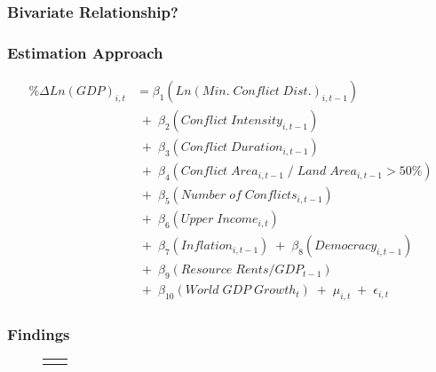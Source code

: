 \begin{frame}
\frametitle{Bivariate Relationship?}

\vspace{-0.25cm}
\begin{figure}[ht]
  \centering
  \resizebox{1\textwidth}{!}{}
\end{figure}

\end{frame}

\begin{frame}
\frametitle{Estimation Approach}

\begin{align*}
	\% \Delta Ln(GDP)_{i,t} &= \beta_{1}(Ln(Min. \; Conflict \; Dist.)_{i,t-1}) \\
	& \;+\; \beta_{2}(Conflict \; Intensity_{i,t-1}) \\
	& \;+\; \beta_{3}(Conflict \; Duration_{i,t-1}) \\
	& \;+\; \beta_{4}(Conflict \; Area_{i,t-1} \;/\; Land \; Area_{i,t-1} > 50\%) \\
	& \;+\; \beta_{5}(Number \; of \; Conflicts_{i,t-1}) \\
	& \;+\; \beta_{6}(Upper \; Income_{i,t}) \\	
	& \;+\; \beta_{7}(Inflation_{i,t-1}) \;+\; \beta_{8}(Democracy_{i,t-1}) \\
	& \;+\; \beta_{9}(Resource \; Rents/GDP_{t-1}) \\ 
	& \;+\; \beta_{10}(World \; GDP \; Growth_{t}) \;+\; \mu_{i,t} \;+\; \epsilon_{i,t}
\end{align*}

\end{frame}

\begin{frame}
\frametitle{Findings}

\vspace{-8mm}
\begin{figure}
	\centering
	\begin{tabular}{cc}
	\hspace{-9mm}
		\resizebox{.5\textwidth}{!}{} &
		\resizebox{.5\textwidth}{!}{}
	\end{tabular}
\end{figure}

\end{frame}

